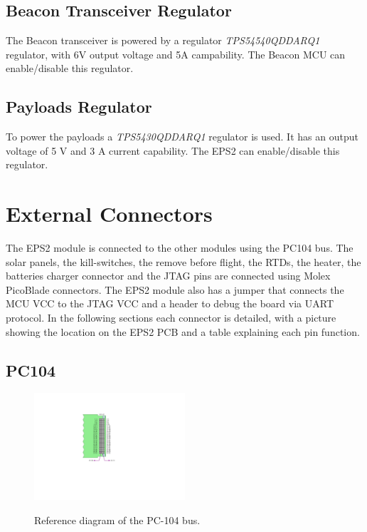 \subsection{Beacon Transceiver Regulator}

The Beacon transceiver is powered by a regulator \textit{TPS54540QDDARQ1} regulator, with 6V output voltage and 5A campability. The Beacon MCU can enable/disable this regulator.

\subsection{Payloads Regulator}

To power the payloads a \textit{TPS5430QDDARQ1} regulator is used. It has an output voltage of 5 V and 3 A current capability. The EPS2 can enable/disable this regulator.

\section{External Connectors}

The EPS2 module is connected to the other modules using the PC104 bus. The solar panels, the kill-switches, the remove before flight, the RTDs, the heater, the batteries charger connector and the JTAG pins are connected using Molex PicoBlade connectors. The EPS2 module also has a jumper that connects the MCU VCC to the JTAG VCC and a header to debug the board via UART protocol. In the following sections each connector is detailed, with a picture showing the location on the EPS2 PCB and a table explaining each pin function.

\subsection{PC104}

\begin{figure}[!ht]
    \begin{center}
        \includegraphics[width=0.5\textwidth]{figures/pc104-diagram}
        \label{fig:pc104-diagram}
        \caption{Reference diagram of the PC-104 bus.}
    \end{center}
\end{figure}

